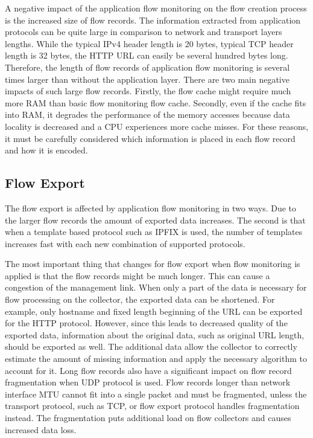 A negative impact of the application flow monitoring on the flow creation process is the increased size of flow records. The information extracted from application protocols can be quite large in comparison to network and transport layers lengths. While the typical IPv4 header length is 20 bytes, typical TCP header length is 32 bytes, the HTTP URL can easily be several hundred bytes long. Therefore, the length of flow records of application flow monitoring is several times larger than without the application layer. There are two main negative impacts of such large flow records. Firstly, the flow cache might require much more RAM than basic flow monitoring flow cache. Secondly, even if the cache fits into RAM, it degrades the performance of the memory accesses because data locality is decreased and a CPU experiences more cache misses. For these reasons, it must be carefully considered which information is placed in each flow record and how it is encoded.

\subsection{Flow Export}

The flow export is affected by application flow monitoring in two ways. Due to the larger flow records the amount of exported data increases. The second is that when a template based protocol such as IPFIX is used, the number of templates increases fast with each new combination of supported protocols.

The most important thing that changes for flow export when flow monitoring is applied is that the flow records might be much longer. This can cause a congestion of the management link. When only a part of the data is necessary for flow processing on the collector, the exported data can be shortened. For example, only hostname and fixed length beginning of the URL can be exported for the HTTP protocol. However, since this leads to decreased quality of the exported data, information about the original data, such as original URL length, should be exported as well. The additional data allow the collector to correctly estimate the amount of missing information and apply the necessary algorithm to account for it. Long flow records also have a significant impact on flow record fragmentation when UDP protocol is used. Flow records longer than network interface MTU cannot fit into a single packet and must be fragmented, unless the transport protocol, such as TCP,  or flow export protocol handles fragmentation instead. The fragmentation puts additional load on flow collectors and causes increased data loss.

